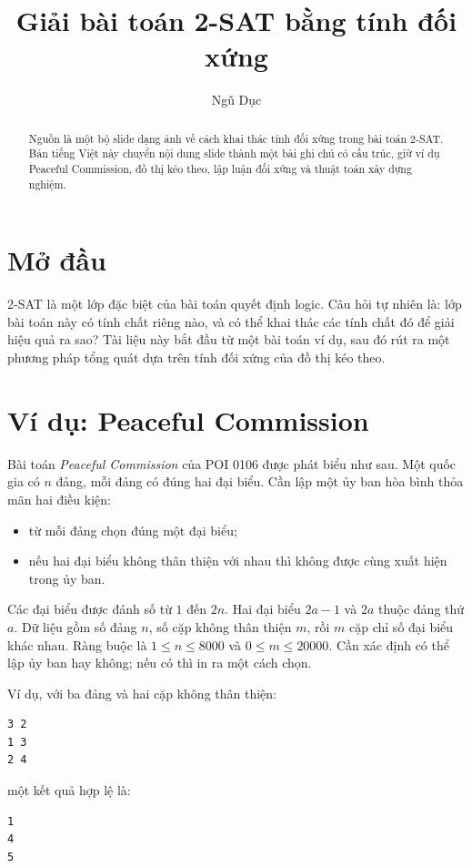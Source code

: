 \documentclass[11pt]{article}
\title{Giải bài toán 2-SAT bằng tính đối xứng}
\author{Ngũ Dục}
\date{}
\begin{document}
\maketitle
{}

\begin{abstract}
Nguồn là một bộ slide dạng ảnh về cách khai thác tính đối xứng trong bài toán
2-SAT. Bản tiếng Việt này chuyển nội dung slide thành một bài ghi chú có cấu
trúc, giữ ví dụ Peaceful Commission, đồ thị kéo theo, lập luận đối xứng và
thuật toán xây dựng nghiệm.
\end{abstract}

\section{Mở đầu}

2-SAT là một lớp đặc biệt của bài toán quyết định logic. Câu hỏi tự
nhiên là: lớp bài toán này có tính chất riêng nào, và có thể khai thác
các tính chất đó để giải hiệu quả ra sao? Tài liệu này bắt đầu từ một
bài toán ví dụ, sau đó rút ra một phương pháp tổng quát dựa trên tính
đối xứng của đồ thị kéo theo.

\section{Ví dụ: Peaceful Commission}

Bài toán \textit{Peaceful Commission} của POI 0106 được phát biểu như
sau. Một quốc gia có $n$ đảng, mỗi đảng có đúng hai đại biểu. Cần lập
một ủy ban hòa bình thỏa mãn hai điều kiện:
\begin{itemize}
  \item từ mỗi đảng chọn đúng một đại biểu;
  \item nếu hai đại biểu không thân thiện với nhau thì không được cùng
  xuất hiện trong ủy ban.
\end{itemize}

Các đại biểu được đánh số từ $1$ đến $2n$. Hai đại biểu $2a-1$ và $2a$
thuộc đảng thứ $a$. Dữ liệu gồm số đảng $n$, số cặp không thân thiện
$m$, rồi $m$ cặp chỉ số đại biểu khác nhau. Ràng buộc là
$1 \le n \le 8000$ và $0 \le m \le 20000$. Cần xác định có thể lập ủy
ban hay không; nếu có thì in ra một cách chọn.

Ví dụ, với ba đảng và hai cặp không thân thiện:
\begin{verbatim}
3 2
1 3
2 4
\end{verbatim}
một kết quả hợp lệ là:
\begin{verbatim}
1
4
5
\end{verbatim}
\end{document}
